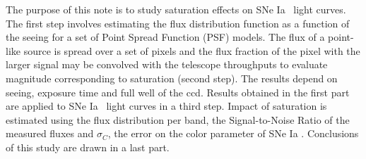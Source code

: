 \documentclass[\docopts]{\docclass}
\newcommand{\sne}{{SNe Ia }}
\newcommand{\colorerr}{{$\sigma_C$}}
\begin{document}
The purpose of this note is to study saturation effects on \sne~light curves. The first step involves estimating the flux distribution function as a function of the seeing for a set of Point Spread Function (PSF) models. The flux of a point-like source is spread over a set of pixels and the flux fraction of the pixel with the larger signal may be convolved with the telescope throughputs to evaluate magnitude corresponding to saturation (second step). The results depend on seeing, exposure time and full well of the ccd. Results obtained in the first part are applied to \sne~light curves in a third step. Impact of saturation is estimated using the flux distribution per band, the Signal-to-Noise Ratio of the measured fluxes and \colorerr, the error on the color parameter of \sne. Conclusions of this study are drawn in a last part. 

\end{document}
